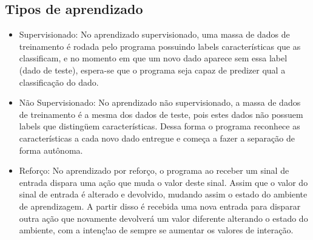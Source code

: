 \subsection{Tipos de aprendizado}
    \begin{itemize}
        \item Supervisionado: No aprendizado supervisionado, uma massa de dados de treinamento é rodada pelo programa possuindo labels características que as classificam, e no momento em que um novo dado aparece sem essa label (dado de teste), espera-se que o programa seja capaz de predizer qual a classificação do dado.
        \item Não Supervisionado: No aprendizado não supervisionado, a massa de dados de treinamento é a mesma dos dados de teste, pois estes dados não possuem labels que distingüem características. Dessa forma o programa reconhece as características a cada novo dado entregue e começa a fazer a separação de forma autônoma. \cite{chao2011}
        \item Reforço: No aprendizado por reforço, o programa ao receber um sinal de entrada dispara uma ação que muda o valor deste sinal. Assim que o valor do sinal de entrada é alterado e devolvido, mudando assim o estado do ambiente de aprendizagem. A partir disso é recebida uma nova entrada para disparar outra ação que novamente devolverá um valor diferente alterando o estado do ambiente, com a intenç!ao de sempre se aumentar os valores de interação. \cite{kaelbling1996}
    \end{itemize}



